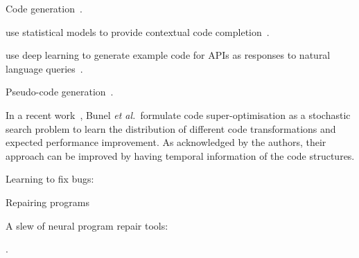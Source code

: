 Code generation~\cite{Zhang2015a}.

\citeauthor{Raychev2014} use statistical models to provide contextual code completion~\cite{Raychev2014}.

\citeauthor{Zhang2015a} use deep learning to generate example code for APIs as responses to natural language queries~\cite{Zhang2015a}.

Pseudo-code generation~\cite{Oda2015}.

In a recent work~\cite{Bunel2017a}, Bunel \emph{et al.\ }formulate code super-optimisation as a stochastic search problem to learn the distribution of different code transformations and expected performance improvement. As acknowledged by the authors, their approach can be improved by having temporal information of the code structures.


Learning to fix bugs:


Repairing programs~\cite{Koukoutos2017a}


A slew of neural program repair tools:

.
%
%
%

